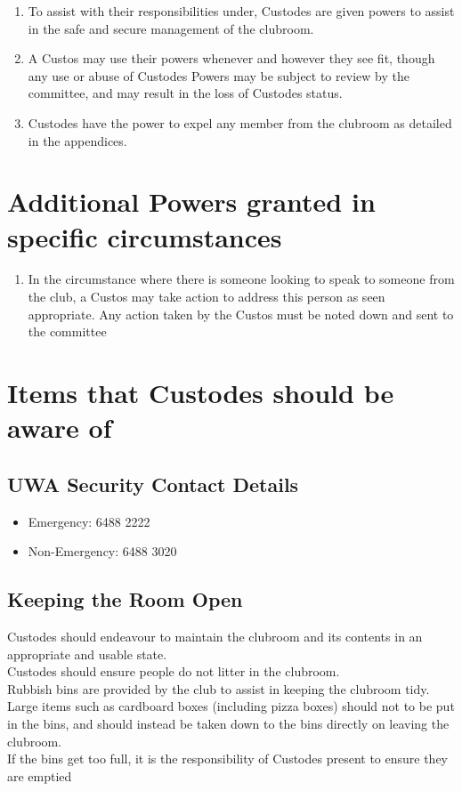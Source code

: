 \documentclass[10pt,a4paper]{report}
\begin{document}
		\begin{enumerate}
			\item To assist with their responsibilities under, Custodes are given powers to assist in the safe and secure management of the clubroom.
			\item A Custos may use their powers whenever and however they see fit, though any use or abuse of Custodes Powers may be subject to review by the committee, and may result in the loss of Custodes status.
			\item Custodes have the power to expel any member from the clubroom as detailed in the appendices.
		\end{enumerate}
		
		\section{Additional Powers granted in specific circumstances}
		\begin{enumerate}
			\item In the circumstance where there is someone looking to speak to someone from the club, a Custos may take action to address this person as seen appropriate. Any action taken by the Custos must be noted down and sent to the committee
		\end{enumerate}
		
		\section{Items that Custodes should be aware of}
		\subsection{UWA Security Contact Details}
		\begin{itemize}
			\item Emergency: 6488 2222
			\item Non-Emergency: 6488 3020
		\end{itemize}
		\subsection{Keeping the Room Open}
		Custodes should endeavour to maintain the clubroom and its contents in an appropriate and usable state.\\
		Custodes should ensure people do not litter in the clubroom.\\
		Rubbish bins are provided by the club to assist in keeping the clubroom tidy.\\
		Large items such as cardboard boxes (including pizza boxes) should not to be put in the bins, and should instead be taken down to the bins directly on leaving the clubroom.\\
		If the bins get too full, it is the responsibility of Custodes present to ensure they are emptied
		
\end{document}
